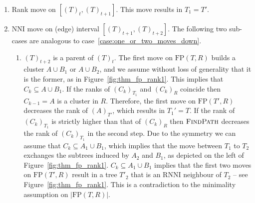 \documentclass[11pt]{amsart}
\newcommand{\rnni}{\mathrm{RNNI}}
\newcommand{\findpath}{\textsc{FindPath}}
\newcommand{\nni}{\mathrm{NNI}}
\newcommand{\fp}{\mathrm{FP}}
\begin{document}
\begin{enumerate}[label = 2.\arabic*]
\item Rank move on $[(T)_t,(T)_{t+1}]$.
This move results in $T_1 = T'$.

\item $\nni$ move on (edge) interval $[(T)_{t+1},(T)_{t+2}]$.
The following two sub-cases are analogous to case~\ref{case:one_or_two_moves_down}.

\begin{enumerate}[label = \theenumi.\arabic*]
	\item $(T)_{t+2}$ is a parent of $(T)_t$.
	The first move on $\fp(T, R)$ builds a cluster $A \cup B_1$ or $A \cup B_2$, and we assume without loss of generality that it is the former, as in Figure~\ref{fig:thm_fp_rank1}.
	This implies that $C_k \subseteq A \cup B_1$.
	If the ranks of $(C_k)_{T_1}$ and $(C_k)_R$ coincide then $C_{k-1} = A$ is a cluster in $R$.
	Therefore, the first move on $\fp(T', R)$ decreases the rank of $(A)_{T'}$, which results in $T_1' = T$.
	If the rank of $(C_k)_{T_1}$ is strictly higher than that of $(C_k)_R$ then $\findpath$ decreases the rank of $(C_k)_{T_1}$ in the second step.
	Due to the symmetry we can assume that $C_k \subseteq A_1 \cup B_1$, which implies that the move between $T_1$ to $T_2$ exchanges the subtrees induced by $A_2$ and $B_1$, as depicted on the left of Figure~\ref{fig:thm_fp_rank1}.
	$C_k \subseteq A_1 \cup B_1$ implies that the first two moves on $\fp(T', R)$ result in a tree $T'_2$ that is an $\rnni$ neighbour of $T_2$ -- see Figure~\ref{fig:thm_fp_rank1}.
	This is a contradiction to the minimality assumption on $|\fp(T,R)|$.


\end{enumerate}
\end{enumerate}
\end{document}
